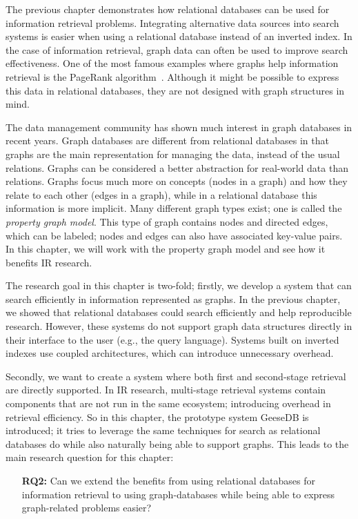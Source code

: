 The previous chapter demonstrates how relational databases can be used for information retrieval problems. Integrating alternative data sources into search systems is easier when using a relational database instead of an inverted index. In the case of information retrieval, graph data can often be used to improve search effectiveness. One of the most famous examples where graphs help information retrieval is the PageRank algorithm~\citep{pagerank}. Although it might be possible to express this data in relational databases, they are not designed with graph structures in mind. 

The data management community has shown much interest in graph databases in recent years. Graph databases are different from relational databases in that graphs are the main representation for managing the data, instead of the usual relations. Graphs can be considered a better abstraction for real-world data than relations. Graphs focus much more on concepts (nodes in a graph) and how they relate to each other (edges in a graph), while in a relational database this information is more implicit. Many different graph types exist; one is called the \emph{property graph model}. This type of graph contains nodes and directed edges, which can be labeled; nodes and edges can also have associated key-value pairs. In this chapter, we will work with the property graph model and see how it benefits IR research.

The research goal in this chapter is two-fold; firstly, we develop a system that can search efficiently in information represented as graphs. In the previous chapter, we showed that relational databases could search efficiently and help reproducible research. However, these systems do not support graph data structures directly in their interface to the user (e.g., the query language). Systems built on inverted indexes use coupled architectures, which can introduce unnecessary overhead.

Secondly, we want to create a system where both first and second-stage retrieval are directly supported. In IR research, multi-stage retrieval systems contain components that are not run in the same ecosystem; introducing overhead in retrieval efficiency. 
So in this chapter, the prototype system GeeseDB is introduced; it tries to leverage the same techniques for search as relational databases do while also naturally being able to support graphs. This leads to the main research question for this chapter:

\begin{itemize}
	\item[\textbf{RQ2:}] Can we extend the benefits from using relational databases for information retrieval to using graph-databases while being able to express graph-related problems easier?
\end{itemize} 

